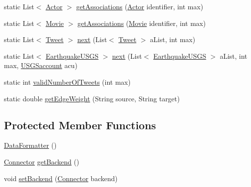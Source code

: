 \begin{DoxyCompactItemize}
\item 
static List$<$ \hyperlink{classbridges_1_1data__src__dependent_1_1_actor}{Actor} $>$ \hyperlink{classbridges_1_1connect_1_1_data_formatter_a5e9f400a020b99e0bbba1fd5332a8f88}{get\+Associations} (\hyperlink{classbridges_1_1data__src__dependent_1_1_actor}{Actor} identifier, int max)
\item 
static List$<$ \hyperlink{classbridges_1_1data__src__dependent_1_1_movie}{Movie} $>$ \hyperlink{classbridges_1_1connect_1_1_data_formatter_ad0377b692c07836fb1016e5fb296e79c}{get\+Associations} (\hyperlink{classbridges_1_1data__src__dependent_1_1_movie}{Movie} identifier, int max)
\item 
static List$<$ \hyperlink{classbridges_1_1data__src__dependent_1_1_tweet}{Tweet} $>$ \hyperlink{classbridges_1_1connect_1_1_data_formatter_a3d0b2d2e0384d2a537bb61fbeb3d00a4}{next} (List$<$ \hyperlink{classbridges_1_1data__src__dependent_1_1_tweet}{Tweet} $>$ a\+List, int max)
\item 
static List$<$ \hyperlink{classbridges_1_1data__src__dependent_1_1_earthquake_u_s_g_s}{Earthquake\+U\+S\+GS} $>$ \hyperlink{classbridges_1_1connect_1_1_data_formatter_ad451dd96b927702127d383e85fc98661}{next} (List$<$ \hyperlink{classbridges_1_1data__src__dependent_1_1_earthquake_u_s_g_s}{Earthquake\+U\+S\+GS} $>$ a\+List, int max, \hyperlink{classbridges_1_1data__src__dependent_1_1_u_s_g_saccount}{U\+S\+G\+Saccount} acu)
\item 
static int \hyperlink{classbridges_1_1connect_1_1_data_formatter_ad17084ac8b0f28837ebb1d77905cefb8}{valid\+Number\+Of\+Tweets} (int max)
\item 
static double \hyperlink{classbridges_1_1connect_1_1_data_formatter_a2637c733e7f4efccfb56de0940506318}{get\+Edge\+Weight} (String source, String target)
\end{DoxyCompactItemize}
\subsection*{Protected Member Functions}
\begin{DoxyCompactItemize}
\item 
\hyperlink{classbridges_1_1connect_1_1_data_formatter_a31efd2251e98942e58e743dff213ef27}{Data\+Formatter} ()
\item 
\hyperlink{classbridges_1_1connect_1_1_connector}{Connector} \hyperlink{classbridges_1_1connect_1_1_data_formatter_a29cf4c2b0c5629d63a76b60569355c65}{get\+Backend} ()
\item 
void \hyperlink{classbridges_1_1connect_1_1_data_formatter_af9b878e5c092234a6ab5f8c11bee1fbd}{set\+Backend} (\hyperlink{classbridges_1_1connect_1_1_connector}{Connector} backend)
\end{DoxyCompactItemize}


